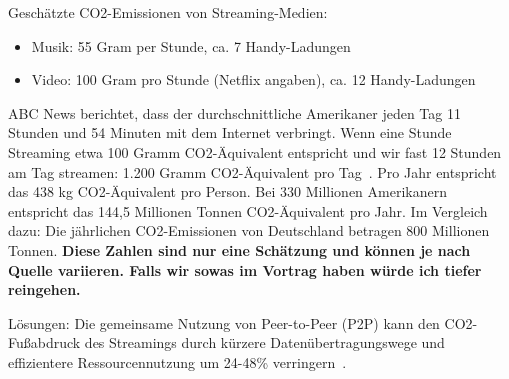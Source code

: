 \documentclass{article}
\begin{document}
Geschätzte CO2-Emissionen von Streaming-Medien:
\begin{itemize}
	\item Musik: 55 Gram per Stunde, ca. 7 Handy-Ladungen
	\item Video: 100 Gram pro Stunde (Netflix angaben), ca. 12 Handy-Ladungen
\end{itemize}
ABC News berichtet, dass der durchschnittliche Amerikaner jeden Tag 11 Stunden und 54 Minuten mit dem Internet verbringt.
Wenn eine Stunde Streaming etwa 100 Gramm CO2-Äquivalent entspricht und wir fast 12 Stunden am Tag streamen: 1.200 Gramm CO2-Äquivalent pro Tag~\cite{noauthor_is_nodate}.
Pro Jahr entspricht das 438 kg CO2-Äquivalent pro Person.
Bei 330 Millionen Amerikanern entspricht das 144,5 Millionen Tonnen CO2-Äquivalent pro Jahr.
Im Vergleich dazu: Die jährlichen CO2-Emissionen von Deutschland betragen 800 Millionen Tonnen.
\textbf{Diese Zahlen sind nur eine Schätzung und können je nach Quelle variieren.
	Falls wir sowas im Vortrag haben würde ich tiefer reingehen.}


Lösungen:
Die gemeinsame Nutzung von Peer-to-Peer (P2P) kann den CO2-Fußabdruck des Streamings durch kürzere Datenübertragungswege und effizientere Ressourcennutzung um 24-48\% verringern~\cite{8416363}.

\clearpage
\printbibliography
\end{document}
